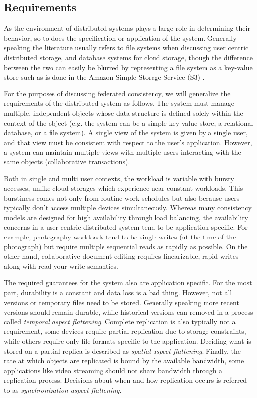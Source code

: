 \documentclass[letterpaper,twocolumn,10pt]{article}
\begin{document}
\subsection{Requirements}

As the environment of distributed systems plays a large role in determining their behavior, so to does the specification or application of the system. Generally speaking the literature usually refers to file systems when discussing user centric distributed storage, and database systems for cloud storage, though the difference between the two can easily be blurred by representing a file system as a key-value store such as is done in the Amazon Simple Storage Service (S3) \cite{bermbach_eventual_2011}.

For the purposes of discussing federated consistency, we will generalize the requirements of the distributed system as follows. The system must manage multiple, independent objects whose data structure is defined solely within the context of the object (e.g. the system can be a simple key-value store, a relational database, or a file system). A single view of the system is given by a single user, and that view must be consistent with respect to the user's application. However, a system can maintain multiple views with multiple users interacting with the same objects (collaborative transactions).


Both in single and multi user contexts, the workload is variable with bursty accesses, unlike cloud storages which experience near constant workloads. This burstiness comes not only from routine work schedules but also because users typically don't access multiple devices simultaneously. Whereas many consistency models are designed for high availability through load balancing, the availability concerns in a user-centric distributed system tend to be application-specific. For example, photography workloads tend to be single writes (at the time of the photograph) but require multiple sequential reads as rapidly as possible. On the other hand, collaborative document editing requires linearizable, rapid writes along with read your write semantics.


The required guarantees for the system also are application specific. For the most part, durability is a constant and data loss is a bad thing. However, not all versions or temporary files need to be stored. Generally speaking more recent versions should remain durable, while historical versions can removed in a process called \textit{temporal aspect flattening}. Complete replication is also typically not a requirement, some devices require partial replication due to storage constraints, while others require only file formats specific to the application. Deciding what is stored on a partial replica is described as \textit{spatial aspect flattening}.  Finally, the rate at which objects are replicated is bound by the available bandwidth, some applications like video streaming should not share bandwidth through a replication process. Decisions about when and how replication occurs is referred to as \textit{synchronization aspect flattening}.
\end{document}
